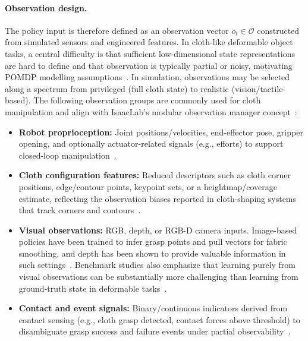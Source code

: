 \paragraph{Observation design.}
The policy input is therefore defined as an observation vector $o_t \in \mathcal{O}$ constructed from simulated sensors and engineered features. In cloth-like deformable object tasks, a central difficulty is that sufficient low-dimensional state representations are hard to define and that observation is typically partial or noisy, motivating \ac{POMDP} modelling assumptions~\cite{Lin2021SoftGym,Spaan2012POMDP}. In simulation, observations may be selected along a spectrum from privileged (full cloth state) to realistic (vision/tactile-based). The following observation groups are commonly used for cloth manipulation and align with IsaacLab's modular observation manager concept~\cite{Lin2021SoftGym,Kadi2023ClothLikeReview,isaaclab_mdp_terms_api,isaaclab_managers_api}:

\begin{itemize}
    \item \textbf{Robot proprioception:} Joint positions/velocities, end-effector pose, gripper opening, and optionally actuator-related signals (e.g., efforts) to support closed-loop manipulation~\cite{Siciliano2009Robotics,isaaclab_mdp_terms_api}.
    \item \textbf{Cloth configuration features:} Reduced descriptors such as cloth corner positions, edge/contour points, keypoint sets, or a heightmap/coverage estimate, reflecting the observation biases reported in cloth-shaping systems that track corners and contours~\cite{Kadi2023ClothLikeReview}.
    \item \textbf{Visual observations:} RGB, depth, or RGB-D camera inputs. Image-based policies have been trained to infer grasp points and pull vectors for fabric smoothing, and depth has been shown to provide valuable information in such settings~\cite{Seita2020FabricSmoothing}. Benchmark studies also emphasize that learning purely from visual observations can be substantially more challenging than learning from ground-truth state in deformable tasks~\cite{Lin2021SoftGym}.
    \item \textbf{Contact and event signals:} Binary/continuous indicators derived from contact sensing (e.g., cloth grasp detected, contact forces above threshold) to disambiguate grasp success and failure events under partial observability~\cite{isaaclab_task_design_workflows}. %
\end{itemize}

